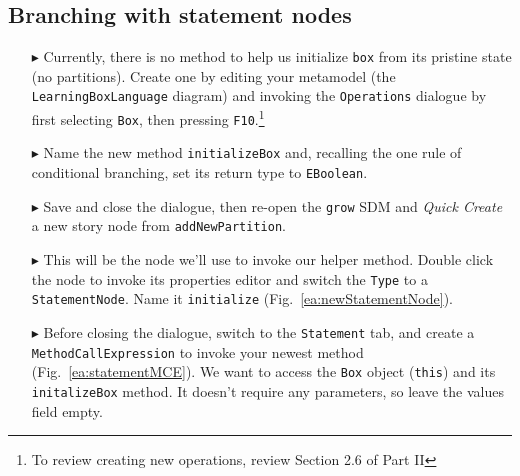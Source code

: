 \clearpage
\hypertarget{conBran vis}{}
\subsection{Branching with statement nodes}
\genHeader

\begin{itemize}

\item[$\blacktriangleright$] Currently, there is no method to help us initialize \texttt{box} from its pristine state (no partitions). Create one by editing
your metamodel (the \texttt{LearningBoxLanguage} diagram) and invoking the \texttt{Operations} dialogue by first selecting \texttt{Box}, then pressing
\texttt{F10}.\footnote{To review creating new operations, review Section 2.6 of Part II}

\item[$\blacktriangleright$] Name the new method \texttt{initializeBox} and, recalling the one rule of conditional branching, set its return type to
\texttt{EBoolean}.

\item[$\blacktriangleright$] Save and close the dialogue, then re-open the \texttt{grow} SDM and \emph{Quick Create} a new story node from
\texttt{addNewPartition}.

\item[$\blacktriangleright$] This will be the node we'll use to invoke our helper method. Double click the node to invoke its properties editor and switch the
\texttt{Type} to a \texttt{StatementNode}. Name it \texttt{initialize} (Fig.~\ref{ea:newStatementNode}).

\item[$\blacktriangleright$] Before closing the dialogue, switch to the \texttt{Statement} tab, and create a \texttt{MethodCallExpression} to invoke your newest
method (Fig.~\ref{ea:statementMCE}). We want to access the \texttt{Box} object (\texttt{this}) and its \texttt{initalizeBox} method. It doesn't require any
parameters, so leave the values field empty. 

\begin{figure}[htbp]
   \centering
      \caption{}
\end{figure}
\FloatBarrier


\end{itemize}
